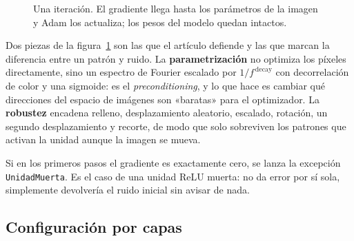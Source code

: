 \documentclass[11pt,a4paper]{article}
\begin{document}
\begin{figure}[htb]
\centering
{}
\caption{Una iteración. El gradiente llega hasta los parámetros de la
imagen y Adam los actualiza; los pesos del modelo quedan intactos.}
\label{fig:bucle}
\end{figure}

Dos piezas de la figura~\ref{fig:bucle} son las que el artículo defiende y
las que marcan la diferencia entre un patrón y ruido. La
\textbf{parametrización} no optimiza los píxeles directamente, sino un
espectro de Fourier escalado por $1/f^{\,\text{decay}}$ con decorrelación de
color y una sigmoide: es el \emph{preconditioning}, y lo que hace es cambiar
qué direcciones del espacio de imágenes son «baratas» para el optimizador.
La \textbf{robustez} encadena relleno, desplazamiento aleatorio, escalado,
rotación, un segundo desplazamiento y recorte, de modo que solo sobreviven
los patrones que activan la unidad aunque la imagen se mueva.

Si en los primeros pasos el gradiente es exactamente cero, se lanza la
excepción \texttt{UnidadMuerta}. Es el caso de una unidad ReLU muerta: no da
error por sí sola, simplemente devolvería el ruido inicial sin avisar de
nada.

\subsection{Configuración por capas}
\end{document}

